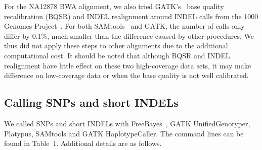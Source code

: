 \documentclass{bioinfo}
\begin{document}
\begin{methods}
For the NA12878 BWA alignment, we also tried GATK's~\citep{Depristo:2011vn}
base quality recalibration (BQSR) and INDEL realignment around INDEL calls from
the 1000 Genomes Project~\citep{1000g:2012aa}. For both
SAMtools~\citep{Li:2011ab} and GATK, the number of calls only differ by 0.1\%,
much smaller than the difference caused by other procedures. We thus did not
apply these steps to other alignments due to the additional computational cost.
It should be noted that although BQSR and INDEL realignment have little effect
on these two high-coverage data sets, it may make difference on low-coverage
data or when the base quality is not well calibrated.

\subsection{Calling SNPs and short INDELs}

We called SNPs and short INDELs with FreeBayes~\citep{Garrison:2012aa}, GATK
UnifiedGenotyper, Platypus, SAMtools and GATK HaplotypeCaller. The command
lines can be found in Table~1. Additional details are as follows.


\end{methods}
\end{document}
